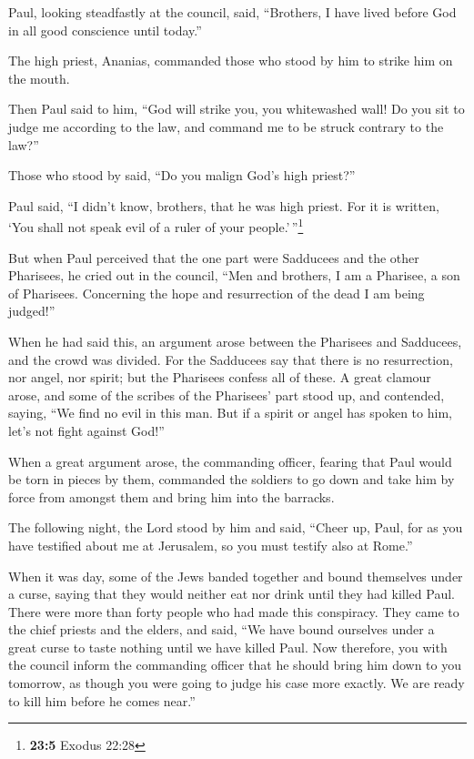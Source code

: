  Paul, looking steadfastly at the council, said,
``Brothers, I have lived before God in all good conscience until
today.''

 The high priest, Ananias, commanded those who stood by
him to strike him on the mouth.

 Then Paul said to him, ``God will strike you, you
whitewashed wall! Do you sit to judge me according to the law, and
command me to be struck contrary to the law?''

 Those who stood by said, ``Do you malign God's high
priest?''

 Paul said, ``I didn't know, brothers, that he was high
priest. For it is written, `You shall not speak evil of a ruler of your
people.'\,''\footnote{\textbf{23:5} Exodus 22:28}

 But when Paul perceived that the one part were Sadducees
and the other Pharisees, he cried out in the council, ``Men and
brothers, I am a Pharisee, a son of Pharisees. Concerning the hope and
resurrection of the dead I am being judged!''

 When he had said this, an argument arose between the
Pharisees and Sadducees, and the crowd was divided.  For
the Sadducees say that there is no resurrection, nor angel, nor spirit;
but the Pharisees confess all of these.  A great clamour
arose, and some of the scribes of the Pharisees' part stood up, and
contended, saying, ``We find no evil in this man. But if a spirit or
angel has spoken to him, let's not fight against God!''

 When a great argument arose, the commanding officer,
fearing that Paul would be torn in pieces by them, commanded the
soldiers to go down and take him by force from amongst them and bring
him into the barracks.

 The following night, the Lord stood by him and said,
``Cheer up, Paul, for as you have testified about me at Jerusalem, so
you must testify also at Rome.''

 When it was day, some of the Jews banded together and
bound themselves under a curse, saying that they would neither eat nor
drink until they had killed Paul.  There were more than
forty people who had made this conspiracy.  They came to
the chief priests and the elders, and said, ``We have bound ourselves
under a great curse to taste nothing until we have killed Paul.
 Now therefore, you with the council inform the
commanding officer that he should bring him down to you tomorrow, as
though you were going to judge his case more exactly. We are ready to
kill him before he comes near.''

